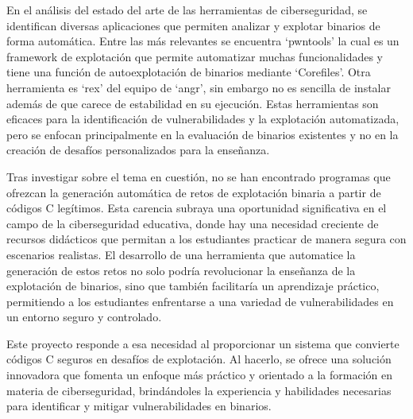 En el análisis del estado del arte de las herramientas de ciberseguridad, se identifican diversas aplicaciones que permiten analizar y explotar binarios de forma automática.
Entre las más relevantes se encuentra `pwntools' la cual es un framework de explotación que permite automatizar muchas funcionalidades y tiene una función de autoexplotación de binarios mediante `Corefiles'.
Otra herramienta es `rex' del equipo de `angr', sin embargo no es sencilla de instalar además de que carece de estabilidad en su ejecución.
Estas herramientas son eficaces para la identificación de vulnerabilidades y la explotación automatizada, pero se enfocan principalmente en la evaluación de binarios existentes y no en la creación de desafíos personalizados para la enseñanza.

Tras investigar sobre el tema en cuestión, no se han encontrado programas que ofrezcan la generación automática de retos de explotación binaria a partir de códigos C legítimos.
Esta carencia subraya una oportunidad significativa en el campo de la ciberseguridad educativa, donde hay una necesidad creciente de recursos didácticos que permitan a los estudiantes practicar de manera segura con escenarios realistas.
El desarrollo de una herramienta que automatice la generación de estos retos no solo podría revolucionar la enseñanza de la explotación de binarios, sino que también facilitaría un aprendizaje práctico, permitiendo a los estudiantes enfrentarse a una variedad de vulnerabilidades en un entorno seguro y controlado.

Este proyecto responde a esa necesidad al proporcionar un sistema que convierte códigos C seguros en desafíos de explotación.
Al hacerlo, se ofrece una solución innovadora que fomenta un enfoque más práctico y orientado a la formación en materia de ciberseguridad, brindándoles la experiencia y habilidades necesarias para identificar y mitigar vulnerabilidades en binarios.